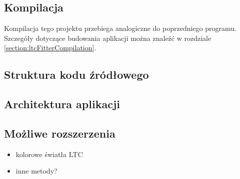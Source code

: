 \documentclass[../main.tex]{subfiles}
\begin{document}
\subsection{Kompilacja}

Kompilacja tego projektu przebiega analogiczne do poprzedniego programu. Szczegóły dotyczące budowania aplikacji można znaleźć w rozdziale \ref{section:ltcFitterCompilation}.

\subsection{Struktura kodu źródłowego}
\subsection{Architektura aplikacji}
\subsection{Możliwe rozszerzenia}

\begin{itemize}
    \item kolorowe światła LTC
    \item inne metody?
\end{itemize}
\end{document}
